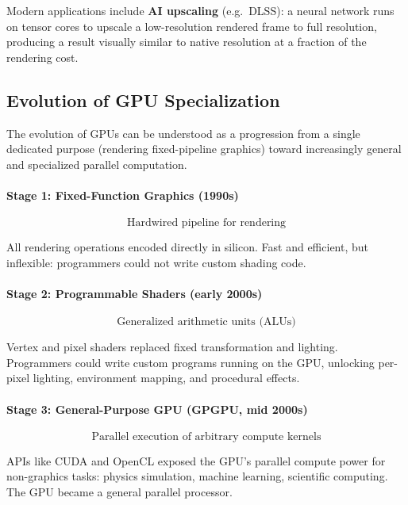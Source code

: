 \documentclass[11pt]{article}
\begin{document}
Modern applications include \textbf{AI upscaling} (e.g.\ DLSS): a neural network runs on tensor cores to upscale a low-resolution rendered frame to full resolution, producing a result visually similar to native resolution at a fraction of the rendering cost.


\subsection{Evolution of GPU Specialization}

The evolution of GPUs can be understood as a progression from a single dedicated purpose (rendering fixed-pipeline graphics) toward increasingly general and specialized parallel computation.

\paragraph{Stage 1: Fixed-Function Graphics (1990s)}

\begin{equation}
    \text{Hardwired pipeline for rendering}
\end{equation}

All rendering operations encoded directly in silicon. Fast and efficient, but inflexible: programmers could not write custom shading code.

\paragraph{Stage 2: Programmable Shaders (early 2000s)}

\begin{equation}
    \text{Generalized arithmetic units (ALUs)}
\end{equation}

Vertex and pixel shaders replaced fixed transformation and lighting. Programmers could write custom programs running on the GPU, unlocking per-pixel lighting, environment mapping, and procedural effects.

\paragraph{Stage 3: General-Purpose GPU (GPGPU, mid 2000s)}

\begin{equation}
    \text{Parallel execution of arbitrary compute kernels}
\end{equation}

APIs like CUDA and OpenCL exposed the GPU's parallel compute power for non-graphics tasks: physics simulation, machine learning, scientific computing. The GPU became a general parallel processor.
\end{document}
